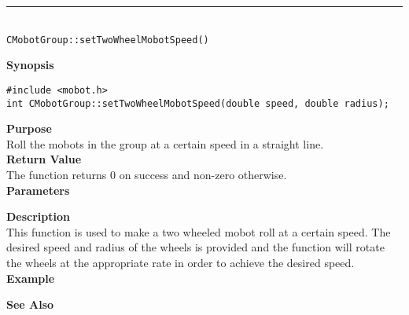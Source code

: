 \noindent
\vspace{5pt}
\rule{4.5in}{0.015in}\\
\noindent
{\LARGE \texttt{CMobotGroup::setTwoWheelMobotSpeed()}}\\
{}

\noindent
{\bf Synopsis}
\vspace{-8pt}
\begin{verbatim}
#include <mobot.h>
int CMobotGroup::setTwoWheelMobotSpeed(double speed, double radius);
\end{verbatim}

\noindent
{\bf Purpose}\\
Roll the mobots in the group at a certain speed in a straight line.\\

\noindent
{\bf Return Value}\\
The function returns 0 on success and non-zero otherwise.\\

\noindent
{\bf Parameters}
\vspace{-0.1in}

\noindent
{\bf Description}\\
This function is used to make a two wheeled mobot roll at a certain speed. The desired 
speed and radius of the wheels is provided and the function will rotate the wheels at the
appropriate rate in order to achieve the desired speed.
\noindent\\
{\bf Example}\\
\noindent

\noindent
{\bf See Also}\\

